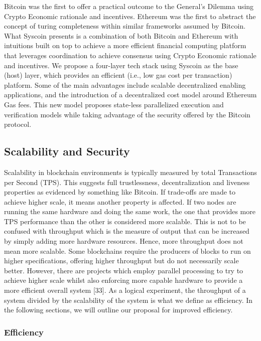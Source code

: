 \documentclass[peerreview]{ieeesyscoin}
\begin{document}
Bitcoin was the first to offer a practical outcome to the General's Dilemma using Crypto Economic rationale and incentives. Ethereum was the first to abstract the concept of turing completeness within similar frameworks assumed by Bitcoin. What Syscoin presents is a combination of both Bitcoin and Ethereum with intuitions built on top to achieve a more efficient financial computing platform that leverages coordination to achieve consensus using Crypto Economic rationale and incentives. We propose a four-layer tech stack using Syscoin as the base (host) layer, which provides an efficient (i.e., low gas cost per transaction) platform. Some of the main advantages include scalable decentralized enabling applications, and the introduction of a decentralized cost model around Ethereum Gas fees. This new model proposes state-less parallelized execution and verification models while taking advantage of the security offered by the Bitcoin protocol. 

\subsection{Scalability and Security}

Scalability in blockchain environments is typically measured by total Transactions per Second (TPS). This suggests full trustlessness, decentralization and liveness properties as evidenced by something like Bitcoin. If trade-offs are made to achieve higher scale, it means another property is affected. If two nodes are running the same hardware and doing the same work, the one that provides more TPS performance than the other is considered more scalable. This is not to be confused with throughput which is the measure of output that can be increased by simply adding more hardware resources. Hence, more throughput does not mean more scalable. Some blockchains require the producers of blocks to run on higher specifications, offering higher throughput but do not necessarily scale better. However, there are projects which employ parallel processing to try to achieve higher scale whilst also enforcing more capable hardware to provide a more efficient overall system [33]. As a logical experiment, the throughput of a system divided by the scalability of the system is what we define as efficiency. In the following sections, we will outline our proposal for improved efficiency.

\subsubsection{Efficiency}
\end{document}
